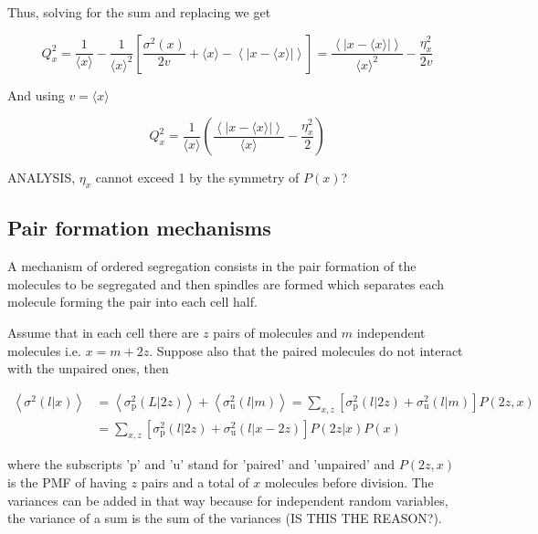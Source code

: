 Thus, solving for the sum and replacing we get

\begin{equation*}
  Q_x^2 = \frac{1}{\langle x\rangle}-\frac{1}{\langle x\rangle^2}\left[\frac{\sigma^2(x)}{2v}+\langle x\rangle-\left\langle\left|x-\langle x\rangle\right|\right\rangle\right] = \frac{\left\langle\left|x-\langle x\rangle\right|\right\rangle}{\langle x\rangle^2}-\frac{\eta_x^2}{2v}
\end{equation*}

And using $v=\langle x\rangle$

\begin{equation}
  \boxed{Q_x^2 = \frac{1}{\langle x\rangle}\left(\frac{\left\langle\left|x-\langle x\rangle\right|\right\rangle}{\langle x\rangle}-\frac{\eta_x^2}{2}\right)}
\end{equation}

ANALYSIS, $\eta_x$ cannot exceed 1 by the symmetry of $P(x)$?

\subsection{Pair formation mechanisms}
A mechanism of ordered segregation consists in the pair formation of the molecules to be segregated and then spindles are formed which separates each molecule forming the pair into each cell half.

Assume that in each cell there are $z$ pairs of molecules and $m$ independent molecules i.e. $x=m+2z$. Suppose also that the paired molecules do not interact with the unpaired ones, then

\begin{equation}
  \label{eq:div-pu}
  \begin{split}
  \left\langle\sigma^2(l|x)\right\rangle &= \left\langle\sigma^2_\text{p}(L|2z)\right\rangle + \left\langle\sigma^2_\text{u}(l|m)\right\rangle = \sum_{x,z}\left[\sigma^2_\text{p}(l|2z) + \sigma^2_\text{u}(l|m)\right]P(2z,x)\\
  &= \sum_{x,z}\left[\sigma^2_\text{p}(l|2z) + \sigma^2_\text{u}(l|x-2z)\right]P(2z|x)P(x)
  \end{split}
\end{equation}

where the subscripts 'p' and 'u' stand for 'paired' and 'unpaired' and $P(2z,x)$ is the PMF of having $z$ pairs and a total of $x$ molecules before division. The variances can be added in that way because for independent random variables, the variance of a sum is the sum of the variances (IS THIS THE REASON?).

